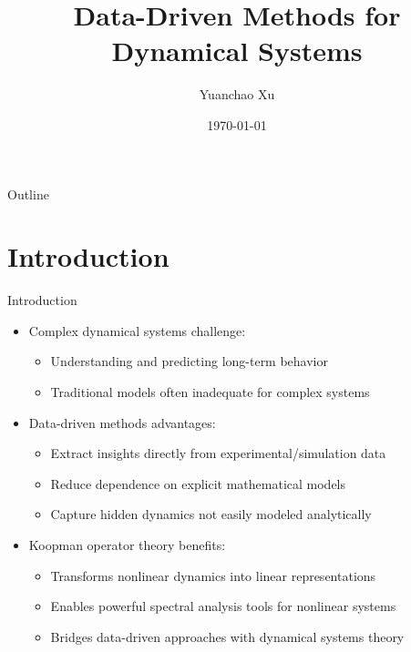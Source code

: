 \documentclass{beamer}
\title{Data-Driven Methods for Dynamical Systems}
\author{Yuanchao Xu}
\institute{University of Alberta}
\date{\today}
\begin{document}
	
	\begin{frame}
		\titlepage
	\end{frame}
	
	\begin{frame}{Outline}
		\tableofcontents
	\end{frame}
	
	\section{Introduction}
	
	\begin{frame}{Introduction}
		\begin{itemize}
			\item Complex dynamical systems challenge:
			\begin{itemize}
				\item Understanding and predicting long-term behavior
				\item Traditional models often inadequate for complex systems
			\end{itemize}
			\item Data-driven methods advantages:
			\begin{itemize}
				\item Extract insights directly from experimental/simulation data
				\item Reduce dependence on explicit mathematical models
				\item Capture hidden dynamics not easily modeled analytically
			\end{itemize}
			\item Koopman operator theory benefits:
			\begin{itemize}
				\item Transforms nonlinear dynamics into linear representations
				\item Enables powerful spectral analysis tools for nonlinear systems
				\item Bridges data-driven approaches with dynamical systems theory
			\end{itemize}
		\end{itemize}
	\end{frame}
	
\end{document}
